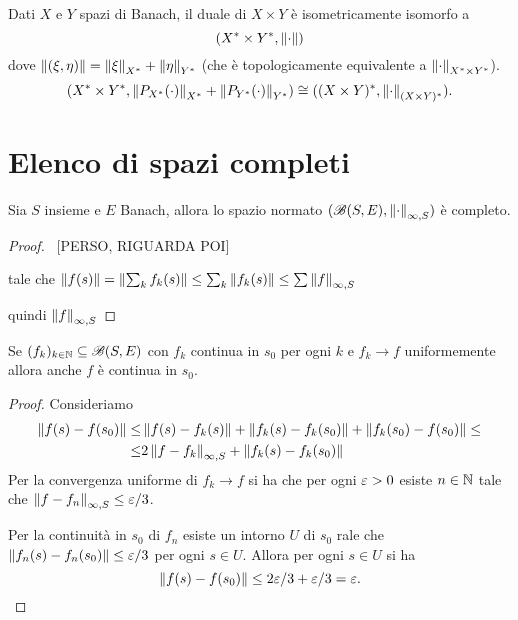 \begin{proposition}\label{PrDualeProdottoEProdottoDuali}
Dati $X$ e $Y$ spazi di Banach, il duale di $X\times Y$ \`e isometricamente isomorfo a
\[(X^\ast\times Y^\ast,{\left\Vert{\cdot}\right\Vert})\]
dove $\left\Vert{(\xi,\eta)}\right\Vert=\left\Vert{\xi}\right\Vert_{X^\ast}+\left\Vert{\eta}\right\Vert_{Y^\ast}$ (che \`e topologicamente equivalente a ${\left\Vert{\cdot}\right\Vert}_{X^\ast\times Y^\ast}$).
\[(X^\ast\times Y^\ast,\left\Vert{P_{X^\ast}(\cdot)}\right\Vert_{X^\ast}+\left\Vert{P_{Y^\ast}(\cdot)}\right\Vert_{Y^\ast})\cong ((X\times Y)^\ast,{\left\Vert{\cdot}\right\Vert}_{(X\times Y)^\ast}).\]
\end{proposition}


\section{Elenco di spazi completi}

\begin{proposition}
Sia $S$ insieme e $E$ Banach, allora lo spazio normato $(\mathscr{B}(S,E),{\left\Vert{\cdot}\right\Vert}_{\infty,S})$ \`e completo.
\end{proposition}
\begin{proof}
~[PERSO, RIGUARDA POI]

tale che $\left\Vert{f(s)}\right\Vert=\left\Vert{\sum_kf_k(s)}\right\Vert\leq \sum_k\left\Vert{f_k(s)}\right\Vert\leq \sum \left\Vert{f}\right\Vert_{\infty,S}$

quindi $\left\Vert{f}\right\Vert_{\infty,S}$
\end{proof}


\begin{lemma}
Se $(f_k)_{k\in\mathbb{N}}\subseteq \mathscr{B}(S,E)$ con $f_k$ continua in $s_0$ per ogni $k$ e $f_k\to f$ uniformemente allora anche $f$ \`e continua in $s_0$.
\end{lemma}
\begin{proof}
Consideriamo
\begin{align*}
\left\Vert{f(s)-f(s_0)}\right\Vert\leq&\left\Vert{f(s)-f_k(s)}\right\Vert+\left\Vert{f_k(s)-f_k(s_0)}\right\Vert+\left\Vert{f_k(s_0)-f(s_0)}\right\Vert\leq\\
\leq&2\left\Vert{f-f_k}\right\Vert_{\infty,S}+\left\Vert{f_k(s)-f_k(s_0)}\right\Vert
\end{align*}
Per la convergenza uniforme di $f_k\to f$ si ha che per ogni $\varepsilon>0$ esiste $n\in\mathbb{N}$ tale che $\left\Vert{f-f_n}\right\Vert_{\infty,S}\leq \varepsilon/3$.

Per la continuit\`a in $s_0$ di $f_n$ esiste un intorno $U$ di $s_0$ rale che $\left\Vert{f_n(s)-f_n(s_0)}\right\Vert\leq \varepsilon/3$ per ogni $s\in U$. Allora per ogni $s\in U$ si ha
\[\left\Vert{f(s)-f(s_0)}\right\Vert\leq2\varepsilon/3+\varepsilon/3=\varepsilon.\]
\end{proof}

